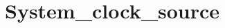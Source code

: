 \hypertarget{group___system__clock__source}{\section{System\-\_\-clock\-\_\-source}
\label{group___system__clock__source}
}
